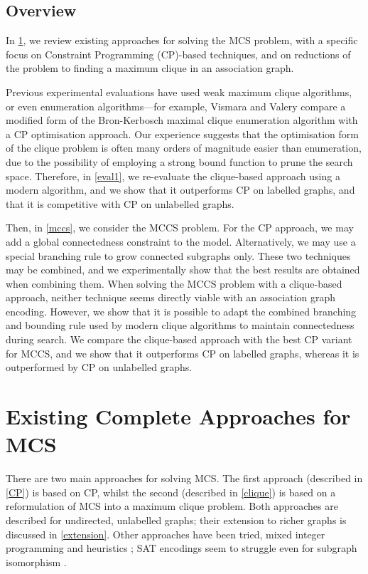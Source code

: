 \documentclass{llncs}
\begin{document}
\subsection{Overview}

In \cref{existing}, we review existing approaches for solving the MCS problem, with a specific focus
on Constraint Programming (CP)-based techniques, and on reductions of the problem to finding a
maximum clique in an association graph.

Previous experimental evaluations have used weak maximum clique algorithms, or even enumeration
algorithms---for example, Vismara and Valery \cite{DBLP:conf/mco/VismaraV08} compare a modified form
of the Bron-Kerbosch maximal clique enumeration algorithm \cite{Bron:1973:AFC:362342.362367} with a
CP optimisation approach. Our experience suggests that the optimisation form of the clique problem
is often many orders of magnitude easier than enumeration, due to the possibility of employing a
strong bound function to prune the search space.  Therefore, in \cref{eval1}, we  re-evaluate the
clique-based approach using a modern algorithm, and we show that it outperforms CP on labelled
graphs, and that it is competitive with CP on unlabelled graphs.

Then, in \cref{mccs}, we consider the MCCS problem. For the CP approach, we may add a global
connectedness constraint to the model. Alternatively, we may use a special branching rule
\cite{DBLP:conf/mco/VismaraV08} to grow connected subgraphs only. These two techniques may
be combined, and we experimentally show that the best results are obtained when combining them.
When solving the MCCS problem with a clique-based approach, neither technique seems directly viable
with an association graph encoding.  However, we show that it is possible to adapt the combined
branching and bounding rule used by modern clique algorithms to maintain connectedness during
search.  We compare the clique-based approach with the best CP variant for MCCS, and we show
that it outperforms CP on labelled graphs, whereas it is outperformed by CP on unlabelled graphs.

\section{Existing Complete Approaches for MCS}\label{existing}

There are two main approaches for solving MCS. The first approach (described in \cref{CP}) is based
on CP, whilst the second (described in \cref{clique}) is based on a reformulation of MCS into a
maximum clique problem. Both approaches are described for undirected, unlabelled graphs; their
extension to richer graphs is discussed in \cref{extension}.  Other approaches have been tried,
mixed integer programming \cite{DBLP:journals/anor/PivaS12} and heuristics
\cite{DBLP:journals/jcisd/EnglertK15}; SAT encodings seem to struggle even for subgraph isomorphism
\cite{UpcomingIJCAIPaper}.
\end{document}

